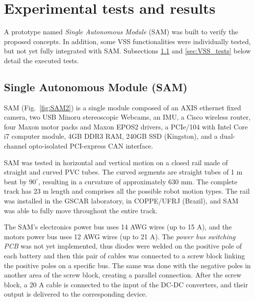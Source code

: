 \documentclass{ifacconf}
\begin{document}



\section{Experimental tests and results}\label{sec:results}
A prototype named \emph{Single Autonomous Module} (SAM) was built to verify the
proposed concepts. In addition, some VSS functionalities were
individually tested, but not yet fully integrated with SAM. Subsections
\ref{sec:SAM_tests} and \ref{sec:VSS_tests} below detail the executed tests.

\subsection{Single Autonomous Module (SAM)}\label{sec:SAM_tests}
SAM (Fig.~\ref{fig:SAM2}) is a single module composed of an AXIS ethernet fixed
camera, two USB Minoru stereoscopic Webcams, an IMU, a Cisco wireless router,
four Maxon motor packs and Maxon EPOS2 drivers, a PCIe/104 with Intel Core i7
computer module, 4GB DDR3 RAM, 240GB SSD (Kingston), and a dual-channel
opto-isolated PCI-express CAN interface.

SAM was tested in horizontal and vertical motion on a closed rail made of
straight and curved PVC tubes. The curved segments are straight tubes of 1 m
bent by $90^{\circ}$, resulting in a curvature of approximately 630 mm. The
complete track has 23 m length and comprises all the possible robot motion
types. The rail was installed in the GSCAR laboratory, in COPPE/UFRJ (Brazil),
and SAM was able to fully move throughout the entire track. 

The SAM's electronics power bus uses 14 AWG wires (up to 15 A), and the motors
power bus uses 12 AWG wires (up to 21 A). The \emph{power
bus switching PCB} was not yet implemented, thus diodes were welded on the
positive pole of each battery and then this pair of cables was connected to a
screw block linking the positive poles on a specific bus. The same was done with
the negative poles in another area of the screw block, creating a parallel
connection. After the screw block, a 20 A cable is connected to the input of
the DC-DC converters, and their output is delivered to the corresponding device.
\end{document}

